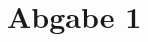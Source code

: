 \documentclass[12pt,a4paper,bibliography=totocnumbered]{scrartcl}
\begin{document}

\pagestyle{fancy}
\renewcommand{\sectionmark}[1]{\markright{\arabic{section}.\ #1}}
\renewcommand{\leftmark}{}
\fancyhf{}
\lhead{}
\chead{}
\rhead{\thesection\space\contentsname}
\cfoot{}
\rfoot{\ \linebreak  \thepage}
\renewcommand{\headrulewidth}{0.4pt}
\renewcommand{\footrulewidth}{0.4pt}




\clearpage

\setcounter{page}{1}

\fancyhead[LE,RO]{\rightmark}
\fancyfoot[LE,RO]{\thepage}


\section*{Abgabe 1}
\end{document}
